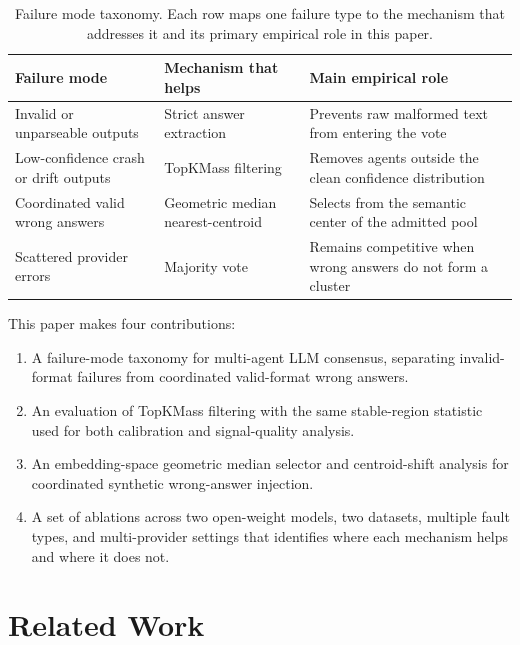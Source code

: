\documentclass[11pt]{article}
\begin{document}
\begin{table}[t]
\centering
\caption{Failure mode taxonomy. Each row maps one failure type to the mechanism
  that addresses it and its primary empirical role in this paper.}
\label{tab:intro-taxonomy}
\scriptsize
\begin{tabularx}{\columnwidth}{p{}p{}X}
\toprule
\textbf{Failure mode} & \textbf{Mechanism that helps} & \textbf{Main empirical role} \\
\midrule
Invalid or unparseable outputs
  & Strict answer extraction
  & Prevents raw malformed text from entering the vote \\[4pt]
Low-confidence crash or drift outputs
  & TopKMass filtering
  & Removes agents outside the clean confidence distribution \\[4pt]
Coordinated valid wrong answers
  & Geometric median nearest-centroid
  & Selects from the semantic center of the admitted pool \\[4pt]
Scattered provider errors
  & Majority vote
  & Remains competitive when wrong answers do not form a cluster \\
\bottomrule
\end{tabularx}
\end{table}

This paper makes four contributions:
\begin{enumerate}[leftmargin=*, itemsep=2pt]
  \item A failure-mode taxonomy for multi-agent LLM consensus, separating
        invalid-format failures from coordinated valid-format wrong answers.
  \item An evaluation of TopKMass filtering with the same stable-region statistic
        used for both calibration and signal-quality analysis.
  \item An embedding-space geometric median selector and centroid-shift analysis
        for coordinated synthetic wrong-answer injection.
  \item A set of ablations across two open-weight models, two datasets, multiple
        fault types, and multi-provider settings that identifies where each
        mechanism helps and where it does not.
\end{enumerate}

\section{Related Work}
\label{sec:related}
\end{document}
